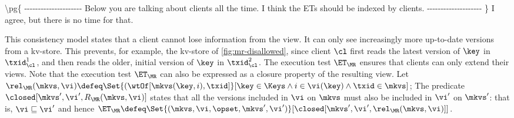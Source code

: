 

\ac{
\pg{
---------------------

Below you are talking about clients all the time. I think the ETs
should be indexed by clients.

--------------------
}
I agree, but there is no time for that.
}

This consistency model states that a client
cannot lose information from the view. It  
can only see increasingly more up-to-date versions from a kv-store. 
This prevents, for example, the kv-store of \cref{fig:mr-disallowed},
since client $\cl$ first reads the latest version of $\key$ in $\txid_{\cl}^{1}$, 
and then reads the older, initial version of $\key$ in $\txid_{\cl}^{2}$.  
The execution test $\ET_{\MR}$ ensures that clients  can only extend their views. 
Note that the execution test $\ET_{\MR}$ can also be expressed as a closure 
property of the resulting view. 
Let $\rel_{\MR}(\mkvs, \vi) \defeq \Set{(\wtOf[\mkvs(\key, i), \txid] }[ \key \in \Keys \wedge i \in \vi(\key) \wedge \txid \in \mkvs]$; 
The predicate $\closed[\mkvs', \vi', R_{\MR}(\mkvs, \vi)]$ states that all the versions included in $\vi$ on $\mkvs$ 
must also be included in $\vi'$ on $\mkvs'$: that is,  $\vi
\sqsubseteq \vi'$ and  hence 
$\ET_{\MR} \defeq \Set{(\mkvs, \vi, \opset, \mkvs', \vi') }[
\closed[\mkvs', \vi', \rel_{\MR}(\mkvs, \vi)]]$.


